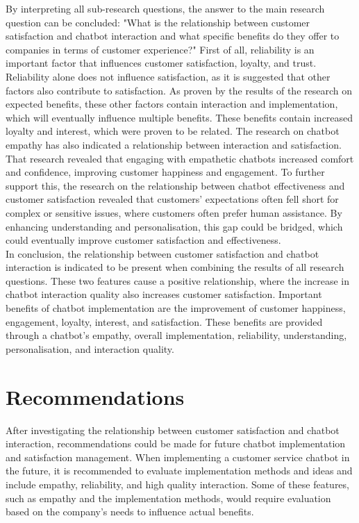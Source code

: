 \documentclass[a4paper]{article}
\begin{document}
By interpreting all sub-research questions, the answer to the main research question can be concluded: "What is the relationship between customer satisfaction and chatbot interaction and what specific benefits do they offer to companies in terms of customer experience?" First of all, reliability is an important factor that influences customer satisfaction, loyalty, and trust. Reliability alone does not influence satisfaction, as it is suggested that other factors also contribute to satisfaction. As proven by the results of the research on expected benefits, these other factors contain interaction and implementation, which will eventually influence multiple benefits. These benefits contain increased loyalty and interest, which were proven to be related. The research on chatbot empathy has also indicated a relationship between interaction and satisfaction. That research revealed that engaging with empathetic chatbots increased comfort and confidence, improving customer happiness and engagement. To further support this, the research on the relationship between chatbot effectiveness and customer satisfaction revealed that customers' expectations often fell short for complex or sensitive issues, where customers often prefer human assistance. By enhancing understanding and personalisation, this gap could be bridged, which could eventually improve customer satisfaction and effectiveness.
\\
In conclusion, the relationship between customer satisfaction and chatbot interaction is indicated to be present when combining the results of all research questions. These two features cause a positive relationship, where the increase in chatbot interaction quality also increases customer satisfaction. Important benefits of chatbot implementation are the improvement of customer happiness, engagement, loyalty, interest, and satisfaction. These benefits are provided through a chatbot's empathy, overall implementation, reliability, understanding, personalisation, and interaction quality. 

\section{Recommendations}

After investigating the relationship between customer satisfaction and chatbot interaction, recommendations could be made for future chatbot implementation and satisfaction management. When implementing a customer service chatbot in the future, it is recommended to evaluate implementation methods and ideas and include empathy, reliability, and high quality interaction. Some of these features, such as empathy and the implementation methods, would require evaluation based on the company's needs to influence actual benefits.
\end{document}
